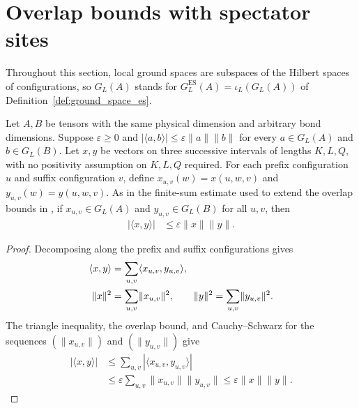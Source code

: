 \section{Overlap bounds with spectator sites}

Throughout this section, local ground spaces are subspaces of
the Hilbert spaces of configurations, so $G_L(A)$ stands for
$G_L^{\mathrm{ES}}(A)=\iota_L(G_L(A))$ of
Definition~\ref{def:ground_space_es}.

\begin{lemma}
    \label{thm:ph_middle_interval_overlap}
    \leanok
    Let $A,B$ be tensors with the same physical dimension and arbitrary bond
    dimensions. Suppose $\varepsilon\geq0$ and
    $|\langle a,b\rangle|\leq\varepsilon\lVert a\rVert\lVert b\rVert$
    for every $a\in G_L(A)$ and $b\in G_L(B)$.
    Let $x,y$ be vectors on three successive intervals of lengths $K,L,Q$,
    with no positivity assumption on $K,L,Q$ required.
    For each prefix configuration $u$ and suffix configuration $v$, define
    $x_{u,v}(w)=x(u,w,v)$ and $y_{u,v}(w)=y(u,w,v)$.
    As in the finite-sum estimate used to extend the overlap bounds in
    \cite[Lemma~6.1(ii)]{Nachtergaele1996Spectral}, if $x_{u,v}\in G_L(A)$ and
    $y_{u,v}\in G_L(B)$ for all $u,v$, then
    \begin{align}
        |\langle x,y\rangle| & \leq\varepsilon\lVert x\rVert\lVert y\rVert.
    \end{align}
\end{lemma}
\begin{proof}
    \leanok
    Decomposing along the prefix and suffix configurations gives
    \begin{align}
        \langle x,y\rangle & =\sum_{u,v}\langle x_{u,v},y_{u,v}\rangle,
        \notag                                                          \\
        \lVert x\rVert^2   & =\sum_{u,v}\lVert x_{u,v}\rVert^2,
        \qquad
        \lVert y\rVert^2=\sum_{u,v}\lVert y_{u,v}\rVert^2.
        \notag
    \end{align}
    The triangle inequality, the overlap bound, and Cauchy--Schwarz for the
    sequences $(\lVert x_{u,v}\rVert)$ and $(\lVert y_{u,v}\rVert)$ give
    \begin{align}
        |\langle x,y\rangle|
         & \leq\sum_{u,v}|\langle x_{u,v},y_{u,v}\rangle|                    \\
         & \leq\varepsilon\sum_{u,v}\lVert x_{u,v}\rVert\lVert y_{u,v}\rVert
        \leq\varepsilon\lVert x\rVert\lVert y\rVert.
    \end{align}
\end{proof}

